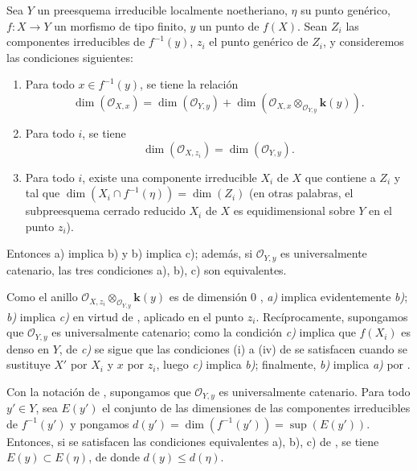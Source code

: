 \begin{proposition}[13.2.10]
\label{IV.13.2.10}
Sea $Y$ un preesquema irreducible localmente noetheriano, $\eta$ su punto genérico, $f:X\to Y$ un morfismo de tipo finito, $y$ un punto de $f(X)$.
Sean $Z_i$ las
componentes irreducibles de $f^{-1}(y)$, $z_i$ el punto genérico de $Z_i$, y consideremos las condiciones siguientes:
\begin{enumerate}[label=\emph{\alph*)}]
  \item Para todo $x\in f^{-1}(y)$, se tiene la relación
  \[
  \tag{13.2.10.1}
  \label{IV.13.2.10.1-fr}
    \dim(\mathcal O_{X,x})=\dim(\mathcal O_{Y,y})
    +\dim(\mathcal O_{X,x}\otimes_{\mathcal O_{Y,y}}\boldsymbol{k}(y)).
  \]
  \item Para todo $i$, se tiene
  \[
  \tag{13.2.10.2}
  \label{IV.13.2.10.2-fr}
    \dim(\mathcal O_{X,z_i})=\dim(\mathcal O_{Y,y}).
  \]
  \item Para todo $i$, existe una componente irreducible $X_i$ de $X$ que contiene a $Z_i$ y tal que $\dim(X_i\cap f^{-1}(\eta))=\dim(Z_i)$ \textup{(en otras palabras,} el subpreesquema cerrado reducido $X_i$ de $X$ es equidimensional sobre $Y$ en el punto $z_i$).
\end{enumerate}
Entonces \textup{a)} implica \textup{b)} y \textup{b)} implica \textup{c)}; además, si $\mathcal O_{Y,y}$ es universalmente catenario, las tres condiciones \textup{a), b), c)} son equivalentes.
\end{proposition}

Como el anillo $\mathcal O_{X,z_i}\otimes_{\mathcal O_{Y,y}}\boldsymbol{k}(y)$ es de dimensión $0$ , \emph{a)} implica evidentemente \emph{b)}; \emph{b)} implica \emph{c)} en virtud de , aplicado en el punto $z_i$.
Recíprocamente, supongamos que $\mathcal O_{Y,y}$ es universalmente catenario; como la condición \emph{c)} implica que $f(X_i)$ es denso en $Y$, de \emph{c)} se sigue que las condiciones (i) a (iv) de  se satisfacen cuando se sustituye $X'$ por $X_i$ y $x$ por $z_i$, luego \emph{c)} implica \emph{b)}; finalmente, \emph{b)} implica \emph{a)} por .

\begin{corollary}[13.2.11]
\label{IV.13.2.11}
Con la notación de , supongamos que $\mathcal O_{Y,y}$ es universalmente catenario.
Para todo $y'\in Y$, sea $E(y')$ el conjunto de las dimensiones de las componentes irreducibles de $f^{-1}(y')$ y pongamos $d(y')=\dim(f^{-1}(y'))=\sup(E(y'))$.
Entonces, si se satisfacen las condiciones equivalentes \textup{a), b), c)} de , se tiene $E(y)\subset E(\eta)$, de donde $d(y)\leq d(\eta)$.
\end{corollary}

